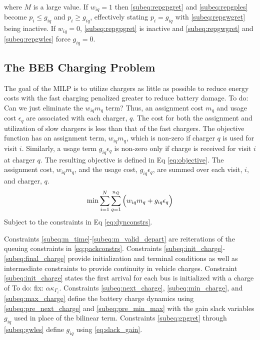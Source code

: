 \documentclass[utf8]{FrontiersinHarvard}
\newcommand{\TODO}[1]{{\color{green} To do: #1}}                                %
\begin{document}
\noindent
where $M$ is a large value. If $w_{iq} = 1$ then \eqref{subeq:repgpgret} and \eqref{subeq:repgples} become $p_i \leq g_{iq}$ and $p_i \geq g_{iq}$, effectively stating $p_i = g_{iq}$ with \eqref{subeq:repgwgret} being inactive.
If $w_{iq} = 0$, \eqref{subeq:repgpgret} is inactive and \eqref{subeq:repgwgret} and \eqref{subeq:repgwles} force $g_{iq} = 0$.

\subsection{The BEB Charging Problem} \label{sec:BEB_MILP}
The goal of the MILP is to utilize chargers as little as possible to reduce energy costs with the fast charging penalized greater to reduce battery damage. \TODO{Can we just eliminate the $w_{iq} m_q$ term? }
Thus, an assignment cost $m_q$ and usage cost $\epsilon_q$ are associated with each charger, $q$. The cost for both the
assignment and utilization of slow chargers is less than that of the fast chargers. The objective function has an
assignment term, $w_{iq}m_q$, which is non-zero if charger $q$ is used for visit $i$. Similarly, a usage term $g_{iq}
\epsilon_q$ is non-zero only if charge is received for visit $i$ at charger $q$. The resulting objective is defined in Eq
\ref{eq:objective}. The assignment cost, $w_{iq}m_q$, and the usage cost, $g_{iq}\epsilon_q$, are summed over each visit, $i$,
and charger, $q$.
\begin{equation}
\label{eq:objective}
	\min \sum_{i=1}^N \sum_{q=1}^{n_Q} \Big( w_{iq} m_q + g_{iq} \epsilon_q \Big) \\
\end{equation}
Subject to the constraints in Eq \ref{eq:dynconstrs}.

Constraints \eqref{subeq:m_time}-\eqref{subeq:m_valid_depart} are reiterations of the queuing constraints in \eqref{eq:packconstrs}.
Constraints \eqref{subeq:init_charge}-\eqref{subeq:final_charge} provide initialization and terminal conditions as well
as intermediate constraints to provide continuity in vehicle charges. Constraint \eqref{subeq:init_charge} states the
first arrival for each bus is initialized with a charge of \TODO{fix:} $\alpha \kappa_{\Gamma_i}$.
Constraints \eqref{subeq:next_charge}, \eqref{subeq:min_charge}, and \eqref{subeq:max_charge} define the battery charge dynamics using \eqref{subeq:pre_next_charge} and \eqref{subeq:pre_min_max} with the gain slack variables $g_{iq}$ used in place of the bilinear term.
Constraints \eqref{subeq:gpgret} through \eqref{subeq:gwles} define $g_{iq}$ using \eqref{eq:slack_gain}.
\end{document}
